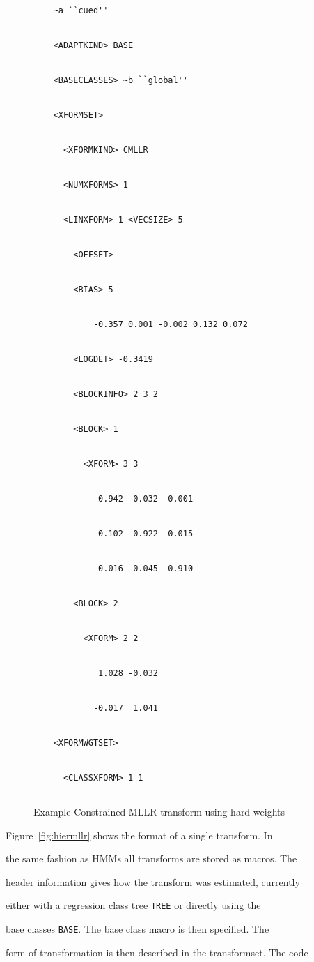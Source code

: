 \begin{figure}[htbp]


\begin{verbatim}


    ~a ``cued''


    <ADAPTKIND> BASE


    <BASECLASSES> ~b ``global''


    <XFORMSET>  


      <XFORMKIND> CMLLR


      <NUMXFORMS> 1


      <LINXFORM> 1 <VECSIZE> 5


        <OFFSET> 


        <BIAS> 5


            -0.357 0.001 -0.002 0.132 0.072


        <LOGDET> -0.3419


        <BLOCKINFO> 2 3 2


        <BLOCK> 1


          <XFORM> 3 3


             0.942 -0.032 -0.001


            -0.102  0.922 -0.015


            -0.016  0.045  0.910


        <BLOCK> 2


          <XFORM> 2 2


             1.028 -0.032


            -0.017  1.041 


    <XFORMWGTSET>


      <CLASSXFORM> 1 1


\end{verbatim}


\caption{Example Constrained MLLR transform using hard weights}


\end{figure}


Figure~\ref{fig:hiermllr} shows the format of a single transform. In


the same fashion as HMMs all transforms are stored as macros. The


header information gives how the transform was estimated, currently


either with a regression class tree {\tt TREE} or directly using the


base classes {\tt BASE}. The base class macro is then specified. The


form of transformation is then described in the transformset. The code


